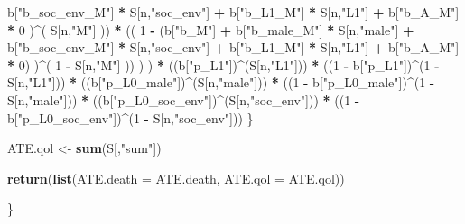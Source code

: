 \documentclass[
]{book}
\newenvironment{Shaded}{\begin{snugshade}}{\end{snugshade}}
\newcommand{\AttributeTok}[1]{\textcolor[rgb]{0.13,0.29,0.53}{#1}}
\newcommand{\DecValTok}[1]{\textcolor[rgb]{0.00,0.00,0.81}{#1}}
\newcommand{\FunctionTok}[1]{\textcolor[rgb]{0.13,0.29,0.53}{\textbf{#1}}}
\newcommand{\NormalTok}[1]{#1}
\newcommand{\OtherTok}[1]{\textcolor[rgb]{0.56,0.35,0.01}{#1}}
\newcommand{\SpecialCharTok}[1]{\textcolor[rgb]{0.81,0.36,0.00}{\textbf{#1}}}
\newcommand{\StringTok}[1]{\textcolor[rgb]{0.31,0.60,0.02}{#1}}
\begin{document}
\begin{Shaded}
\begin{Highlighting}[]
\NormalTok{                             b[}\StringTok{"b\_soc\_env\_M"}\NormalTok{] }\SpecialCharTok{*}\NormalTok{ S[n,}\StringTok{"soc\_env"}\NormalTok{] }\SpecialCharTok{+} 
\NormalTok{                             b[}\StringTok{"b\_L1\_M"}\NormalTok{] }\SpecialCharTok{*}\NormalTok{ S[n,}\StringTok{"L1"}\NormalTok{] }\SpecialCharTok{+}
\NormalTok{                             b[}\StringTok{"b\_A\_M"}\NormalTok{] }\SpecialCharTok{*} \DecValTok{0}\NormalTok{ )}\SpecialCharTok{\^{}}\NormalTok{( S[n,}\StringTok{"M"}\NormalTok{] )) }\SpecialCharTok{*}
\NormalTok{                        (( }\DecValTok{1} \SpecialCharTok{{-}}\NormalTok{ (b[}\StringTok{"b\_M"}\NormalTok{] }\SpecialCharTok{+} 
\NormalTok{                                  b[}\StringTok{"b\_male\_M"}\NormalTok{] }\SpecialCharTok{*}\NormalTok{ S[n,}\StringTok{"male"}\NormalTok{] }\SpecialCharTok{+} 
\NormalTok{                                  b[}\StringTok{"b\_soc\_env\_M"}\NormalTok{] }\SpecialCharTok{*}\NormalTok{ S[n,}\StringTok{"soc\_env"}\NormalTok{] }\SpecialCharTok{+} 
\NormalTok{                                  b[}\StringTok{"b\_L1\_M"}\NormalTok{] }\SpecialCharTok{*}\NormalTok{ S[n,}\StringTok{"L1"}\NormalTok{] }\SpecialCharTok{+}
\NormalTok{                                  b[}\StringTok{"b\_A\_M"}\NormalTok{] }\SpecialCharTok{*} \DecValTok{0}\NormalTok{) )}\SpecialCharTok{\^{}}\NormalTok{( }\DecValTok{1} \SpecialCharTok{{-}}\NormalTok{ S[n,}\StringTok{"M"}\NormalTok{] )) ) ) }\SpecialCharTok{*}
\NormalTok{    ((b[}\StringTok{"p\_L1"}\NormalTok{])}\SpecialCharTok{\^{}}\NormalTok{(S[n,}\StringTok{"L1"}\NormalTok{])) }\SpecialCharTok{*}
\NormalTok{    ((}\DecValTok{1} \SpecialCharTok{{-}}\NormalTok{ b[}\StringTok{"p\_L1"}\NormalTok{])}\SpecialCharTok{\^{}}\NormalTok{(}\DecValTok{1} \SpecialCharTok{{-}}\NormalTok{ S[n,}\StringTok{"L1"}\NormalTok{])) }\SpecialCharTok{*}
\NormalTok{    ((b[}\StringTok{"p\_L0\_male"}\NormalTok{])}\SpecialCharTok{\^{}}\NormalTok{(S[n,}\StringTok{"male"}\NormalTok{])) }\SpecialCharTok{*} 
\NormalTok{    ((}\DecValTok{1} \SpecialCharTok{{-}}\NormalTok{ b[}\StringTok{"p\_L0\_male"}\NormalTok{])}\SpecialCharTok{\^{}}\NormalTok{(}\DecValTok{1} \SpecialCharTok{{-}}\NormalTok{ S[n,}\StringTok{"male"}\NormalTok{])) }\SpecialCharTok{*} 
\NormalTok{    ((b[}\StringTok{"p\_L0\_soc\_env"}\NormalTok{])}\SpecialCharTok{\^{}}\NormalTok{(S[n,}\StringTok{"soc\_env"}\NormalTok{])) }\SpecialCharTok{*}
\NormalTok{    ((}\DecValTok{1} \SpecialCharTok{{-}}\NormalTok{ b[}\StringTok{"p\_L0\_soc\_env"}\NormalTok{])}\SpecialCharTok{\^{}}\NormalTok{(}\DecValTok{1} \SpecialCharTok{{-}}\NormalTok{ S[n,}\StringTok{"soc\_env"}\NormalTok{])) }
\NormalTok{\}}

\NormalTok{ATE.qol }\OtherTok{\textless{}{-}} \FunctionTok{sum}\NormalTok{(S[,}\StringTok{"sum"}\NormalTok{])}

\FunctionTok{return}\NormalTok{(}\FunctionTok{list}\NormalTok{(}\AttributeTok{ATE.death =}\NormalTok{ ATE.death, }\AttributeTok{ATE.qol =}\NormalTok{ ATE.qol))}
  
\NormalTok{\}}
\end{Highlighting}
\end{Shaded}
\end{document}
